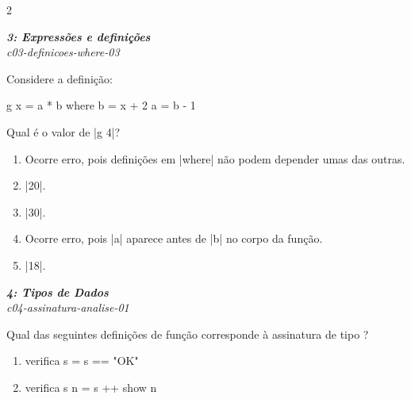 \documentclass[a4paper,10pt,brazil]{article}
\begin{document}
\begin{multicols}{2}
\begin{enumerate}
\end{enumerate}

\begin{flushright}
  \footnotesize
  \textit{\textbf{3: Expressões e definições}}\\
  \textit{c03-definicoes-where-03}\\

\end{flushright}
Considere a definição:

\begin{haskellcode}
g x = a * b
  where
    b = x + 2
    a = b - 1
\end{haskellcode}

Qual é o valor de \haskellinline|g 4|?

\begin{enumerate}
  \item Ocorre erro, pois definições em \haskellinline|where| não podem depender umas das outras.

  \item \haskellinline|20|.

  \item \haskellinline|30|.

  \item Ocorre erro, pois \haskellinline|a| aparece antes de \haskellinline|b| no corpo da função.

  \item \haskellinline|18|.


\end{enumerate}

\begin{flushright}
  \footnotesize
  \textit{\textbf{4: Tipos de Dados}}\\
  \textit{c04-assinatura-analise-01}\\

\end{flushright}
Qual das seguintes definições de função corresponde à assinatura de tipo ?

\begin{enumerate}
  \item \begin{haskellcode}
verifica s = s == "OK"
\end{haskellcode}

  \item \begin{haskellcode}
verifica s n = s ++ show n
\end{haskellcode}


\end{enumerate}
\end{multicols}
\end{document}
